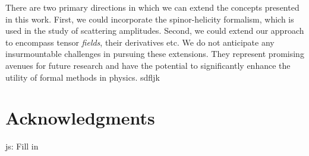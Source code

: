 \documentclass[a4paper, 11pt]{article}
\newcommand{\js}[1]{ {\color{magenta} js:  #1}}
\begin{document}
There are two primary directions in which we can extend the concepts presented in this work. 
First, we could incorporate the spinor-helicity formalism, which is used in the study of scattering 
amplitudes. Second, we could extend our approach to encompass tensor \emph{fields}, their derivatives
etc. We do not anticipate any insurmountable challenges in pursuing these extensions. 
They represent promising avenues for future research and have the potential to significantly enhance
the utility of formal methods in physics. sdfljk
\section*{Acknowledgments}
\js{Fill in}


\begin{spacing}{0.5}

\end{spacing}
\end{document}
